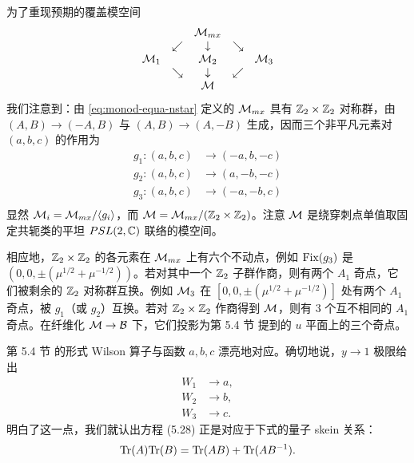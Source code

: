 为了重现预期的覆盖模空间
\begin{equation}\label{eq:A1-covering-maps-nstar}
\begin{matrix}
    &  &  \mathcal{M}_{mx} &  &   \\
    & \swarrow & \downarrow  &  \searrow & \\
    \mathcal{M}_{1} &  & \mathcal{M}_{2} &  & \mathcal{M}_{3} \\
    & \searrow & \downarrow  &  \swarrow & \\
    &  &  \mathcal{M} &  &   \\
\end{matrix}
\end{equation}
我们注意到：由 \eqref{eq:monod-equa-nstar} 定义的 $\mathcal{M}_{mx}$ 具有 $\mathbb{Z}_2\times\mathbb{Z}_2$ 对称群，由 $(A,B)\to(-A,B)$ 与 $(A,B)\to(A,-B)$ 生成，因而三个非平凡元素对 $(a,b,c)$ 的作用为
\begin{equation}
\begin{split}
g_1: (a,b,c) & \rightarrow (-a,b,-c) \\
g_2: (a,b,c) & \rightarrow (a,-b,-c) \\
g_3: (a,b,c) & \rightarrow (-a,-b,c)\\
\end{split}
\end{equation}
显然 $\mathcal{M}_i=\mathcal{M}_{mx}/\langle g_i\rangle$，而 $\mathcal{M}=\mathcal{M}_{mx}/(\mathbb{Z}_2\times\mathbb{Z}_2)$。注意 $\mathcal{M}$ 是绕穿刺点单值取固定共轭类的平坦 $PSL(2,\mathbb{C})$ 联络的模空间。

相应地，$\mathbb{Z}_2\times\mathbb{Z}_2$ 的各元素在 $\mathcal{M}_{mx}$ 上有六个不动点，例如 ${\rm Fix}(g_3)$ 是 $(0,0,\pm(\mu^{1/2}+\mu^{-1/2}))$。若对其中一个 $\mathbb{Z}_2$ 子群作商，则有两个 $A_1$ 奇点，它们被剩余的 $\mathbb{Z}_2$ 对称群互换。例如 $\mathcal{M}_3$ 在 $[0,0,\pm(\mu^{1/2}+\mu^{-1/2})]$ 处有两个 $A_1$ 奇点，被 $g_1$（或 $g_2$）互换。若对 $\mathbb{Z}_2\times\mathbb{Z}_2$ 作商得到 $\mathcal{M}$，则有 $3$ 个互不相同的 $A_1$ 奇点。在纤维化 $\mathcal{M}\to\mathcal{B}$ 下，它们投影为第 5.4 节%
提到的 $u$ 平面上的三个奇点。

第 5.4 节%
的形式 Wilson 算子与函数 $a,b,c$ 漂亮地对应。确切地说，$y\to 1$ 极限给出
\begin{equation}
\begin{split}
W_1 & \to a, \\
W_2 & \to b, \\
W_3 & \to c.
\end{split}
\end{equation}
明白了这一点，我们就认出方程 (5.28)%
正是对应于下式的量子 skein 关系：
\begin{equation}
{\rm Tr}(A) {\rm Tr}(B) = {\rm Tr}(AB) + {\rm Tr}(AB^{-1}).
\end{equation}

